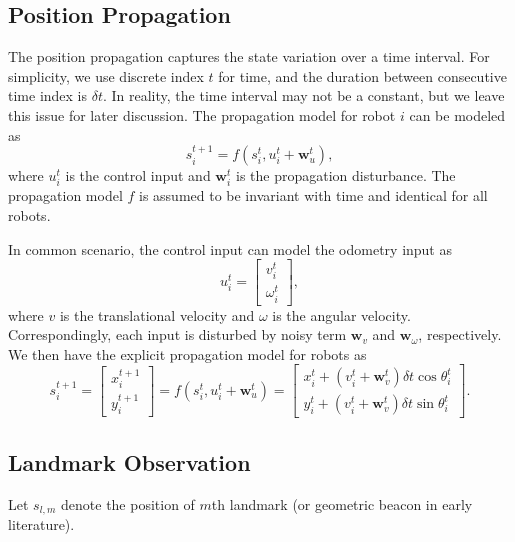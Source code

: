 \documentclass[xcolor=x11names]{article}
\begin{document}
\subsection{Position Propagation}

   The position propagation captures the state variation over a time interval. For simplicity, we use discrete index $t$ for time, and the duration between consecutive time index is $\delta t$. In reality, the time interval may not be a constant, but we leave this issue for later discussion. The propagation model for robot $i$ can be modeled as
   \begin{equation}
      s^{t+1}_{i} = f(s^{t}_{i}, u^{t}_{i} +\mathbf{w}^t_{u}),
   \end{equation}
   where $u^{t}_{i}$ is the control input and $\mathbf{w}^t_{i}$ is the propagation disturbance. The propagation model $f$ is assumed to be invariant with time and identical for all robots.
   
   
   In common scenario, the control input can model the odometry input as
   \begin{equation}
      u^{t}_{i} =
      \begin{bmatrix} 
         v^t_{i} \\ \omega^t_{i}
      \end{bmatrix},      
   \end{equation}
   where $v$ is the translational velocity and $\omega$ is the angular velocity. Correspondingly, each input is disturbed by noisy term $\mathbf{w}_{v}$ and $\mathbf{w}_{\omega}$, respectively. We then have the explicit propagation model for robots as
   \begin{equation}
      s^{t+1}_{i} = 
      \begin{bmatrix} 
         x^{t+1}_{i} \\  y^{t+1}_{i}
      \end{bmatrix}
      = f(s^{t}_{i}, u^{t}_{i} + \mathbf{w}^t_{u})
      = 
      \begin{bmatrix} 
         x^{t}_{i} + (v^t_{i}+\mathbf{w}^t_{v})  \delta t \cos\theta^{t}_{i}   \\  y^{t}_{i} + ( v^t_{i}+\mathbf{w}^t_{v}) \delta t   \sin\theta^{t}_{i} 
      \end{bmatrix}.
   \end{equation}   
   


\subsection{Landmark Observation}
   Let $s_{l,m}$ denote the position of $m$th landmark (or geometric beacon in early literature).
   
\end{document}
